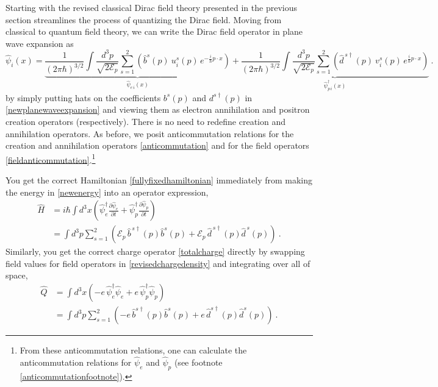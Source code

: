 \documentclass[onecolumn,secnumarabic,amsmath,amssymb,balancelastpage,nofootinbib]{article}
\begin{document}
Starting with the revised classical Dirac field theory presented in the previous section streamlines the process of quantizing the Dirac field.  Moving from classical to quantum field theory, we can write the Dirac field operator in plane wave expansion as
\begin{equation}
\widehat{\psi}_i (x) = \underbrace{\frac{1}{(2\pi\hbar)^{3/2}}\int{ \frac{d^3 p}{\sqrt{2 \mathcal{E}_p}} \sum_{s=1}^2 \left(\widehat{b}^s (p) \: u_i^s (p) \, e^{-\frac{i}{\hbar} p \cdot x}\right)}}_{\mbox{$\widehat{\psi}_{e\,i}(x)$}}
+\underbrace{\frac{1}{(2\pi\hbar)^{3/2}}\int{ \frac{d^3 p}{\sqrt{2 \mathcal{E}_p}} \sum_{s=1}^2 \left(\widehat{d}^{\,s\dagger} (p) \: v_i^s (p) \,  e^{\frac{i}{\hbar} p \cdot x}\right)}}_{\mbox{$\widehat{\psi}^\dagger_{p\,i}(x)$}}
\ .
\end{equation}
by simply putting hats on the coefficients $b^s (p)$ and $d^{s\dagger} (p)$ in \eqref{newplanewaveexpansion} and viewing them as electron annihilation and positron creation operators (respectively).  There is no need to redefine creation and annihilation operators.  As before, we posit anticommutation relations for the creation and annihilation operators \eqref{anticommutation} and for the field operators \eqref{fieldanticommutation}.\footnote{From these anticommutation relations, one can calculate the anticommutation relations for $\widehat{\psi}_{e}$ and $\widehat{\psi}_{p}$ (see footnote \ref{anticommutationfootnote}).}


You get the correct Hamiltonian \eqref{fullyfixedhamiltonian} immediately from making the energy in \eqref{newenergy} into an operator expression,
\begin{align}
\widehat{H}&=i \hbar \int{d^3 x \left(\widehat{\psi}_e^{\dagger}\frac{\partial \widehat{\psi}_e}{\partial t} + \widehat{\psi}_p^{\dagger}\frac{\partial \widehat{\psi}_p}{\partial t}\right)}
\nonumber
\\
&=\int{d^3 p \sum_{s=1}^2  \left(\mathcal{E}_p\,\widehat{b}^{\, s\dagger}(p)\widehat{b}^{s}(p)+\mathcal{E}_p\,\widehat{d}^{\, s\dagger}(p)\widehat{d}^{\,s}(p)\right)}
\ .
\end{align}
Similarly, you get the correct charge operator \eqref{totalcharge} directly by swapping field values for field operators in \eqref{revisedchargedensity} and integrating over all of space,
\begin{align}
\widehat{Q}&= \int{d^3 x \left(-e\, \widehat{\psi}_e^\dagger\widehat{\psi}_e  + e\, \widehat{\psi}_p^\dagger\widehat{\psi}_p\right)}
\nonumber
\\
&=\int{d^3 p \sum_{s=1}^2  \left(-e\,\widehat{b}^{s\dagger}(p)\widehat{b}^s(p)+e\,\widehat{d}^{s\dagger}(p)\widehat{d}^{s}(p)\right)}
\ .
\end{align}
\end{document}
